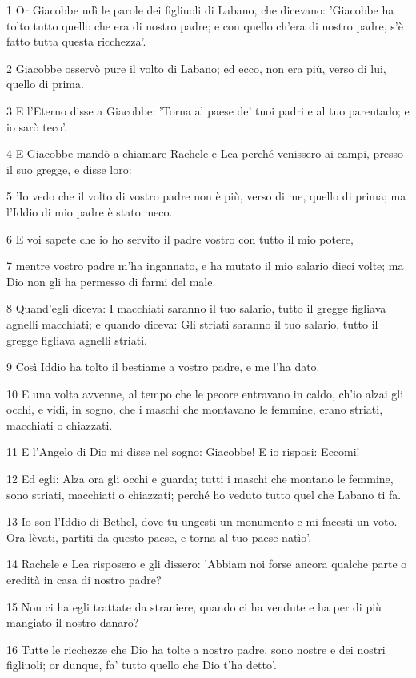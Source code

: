 \par 1 Or Giacobbe udì le parole dei figliuoli di Labano, che dicevano: 'Giacobbe ha tolto tutto quello che era di nostro padre; e con quello ch'era di nostro padre, s'è fatto tutta questa ricchezza'.
\par 2 Giacobbe osservò pure il volto di Labano; ed ecco, non era più, verso di lui, quello di prima.
\par 3 E l'Eterno disse a Giacobbe: 'Torna al paese de' tuoi padri e al tuo parentado; e io sarò teco'.
\par 4 E Giacobbe mandò a chiamare Rachele e Lea perché venissero ai campi, presso il suo gregge, e disse loro:
\par 5 'Io vedo che il volto di vostro padre non è più, verso di me, quello di prima; ma l'Iddio di mio padre è stato meco.
\par 6 E voi sapete che io ho servito il padre vostro con tutto il mio potere,
\par 7 mentre vostro padre m'ha ingannato, e ha mutato il mio salario dieci volte; ma Dio non gli ha permesso di farmi del male.
\par 8 Quand'egli diceva: I macchiati saranno il tuo salario, tutto il gregge figliava agnelli macchiati; e quando diceva: Gli striati saranno il tuo salario, tutto il gregge figliava agnelli striati.
\par 9 Così Iddio ha tolto il bestiame a vostro padre, e me l'ha dato.
\par 10 E una volta avvenne, al tempo che le pecore entravano in caldo, ch'io alzai gli occhi, e vidi, in sogno, che i maschi che montavano le femmine, erano striati, macchiati o chiazzati.
\par 11 E l'Angelo di Dio mi disse nel sogno: Giacobbe! E io risposi: Eccomi!
\par 12 Ed egli: Alza ora gli occhi e guarda; tutti i maschi che montano le femmine, sono striati, macchiati o chiazzati; perché ho veduto tutto quel che Labano ti fa.
\par 13 Io son l'Iddio di Bethel, dove tu ungesti un monumento e mi facesti un voto. Ora lèvati, partiti da questo paese, e torna al tuo paese natìo'.
\par 14 Rachele e Lea risposero e gli dissero: 'Abbiam noi forse ancora qualche parte o eredità in casa di nostro padre?
\par 15 Non ci ha egli trattate da straniere, quando ci ha vendute e ha per di più mangiato il nostro danaro?
\par 16 Tutte le ricchezze che Dio ha tolte a nostro padre, sono nostre e dei nostri figliuoli; or dunque, fa' tutto quello che Dio t'ha detto'.
